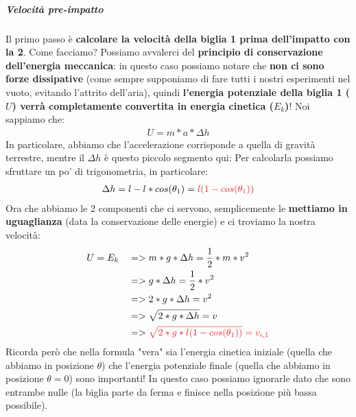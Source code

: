                 \subparagraph{Velocità pre-impatto}
                    Il primo passo è \textbf{calcolare la velocità della biglia 1 prima dell'impatto con la 2}. Come facciamo? Possiamo avvalerci del \textbf{principio di conservazione dell'energia meccanica}: in questo caso possiamo notare che \textbf{non ci sono forze dissipative} (come sempre supponiamo di fare tutti i nostri esperimenti nel vuoto, evitando l'attrito dell'aria), quindi \textbf{l'energia potenziale della biglia 1 ($U$) verrà completamente convertita in energia cinetica ($E_k$)}! Noi sappiamo che:
                    \begin{align*}
                        U = m*a*\Delta h
                    \end{align*}
                    In particolare, abbiamo che l'accelerazione corrisponde a quella di gravità terrestre, mentre il $\Delta h$ è questo piccolo segmento qui:
                    Per calcolarla possiamo sfruttare un po' di trigonometria, in particolare:
                    \begin{align*}
                        \Delta h = l-l*cos(\theta_1)=\textcolor{Red}{l(1-cos(\theta_1))}
                    \end{align*}
                    Ora che abbiamo le 2 componenti che ci servono, semplicemente le \textbf{mettiamo in uguaglianza} (data la conservazione delle energie) e ci troviamo la nostra velocità:
                    \begin{align*}
                        & U = E_k &&=>m*g*\Delta h = \frac{1}{2}*m*v^2\\
                        & && => g*\Delta h = \frac{1}{2}*v^2\\
                        & && => 2*g*\Delta h = v^2\\
                        & && => \sqrt{2*g*\Delta h} = v\\
                        & && => \textcolor{Red}{\sqrt{2*g*l(1-cos(\theta_1))} = v_{i, 1}}
                    \end{align*}
                    Ricorda però che nella formula "vera" sia l'energia cinetica iniziale (quella che abbiamo in posizione $\theta$) che l'energia potenziale finale (quella che abbiamo in posizione $\theta = 0$) sono importanti! In questo caso possiamo ignorarle dato che sono entrambe nulle (la biglia parte da ferma e finisce nella posizione più bassa possibile).

